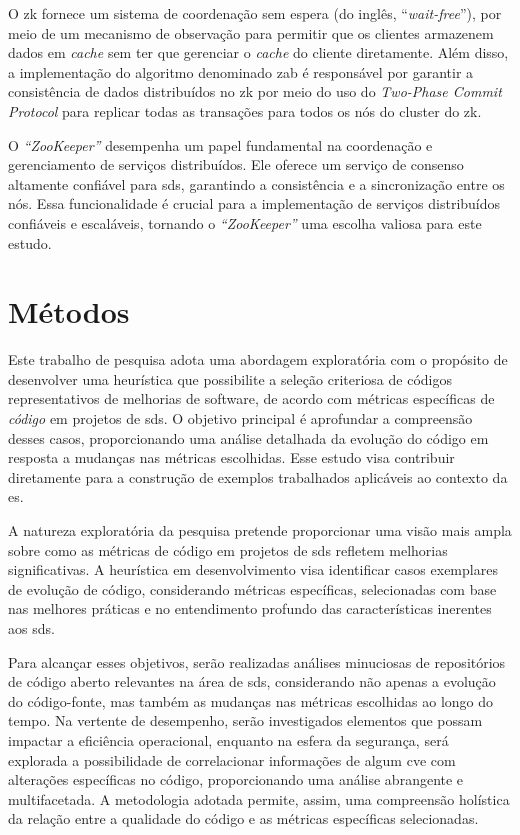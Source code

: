 O \gls{zk} fornece um sistema de coordenação sem espera (do inglês, ``\textit{wait-free}''), por meio de um mecanismo de observação para permitir que os clientes armazenem dados em \textit{cache} sem ter que gerenciar o \textit{cache} do cliente diretamente. Além disso, a implementação do algoritmo denominado \gls{zab} é responsável por garantir a consistência de dados distribuídos no \gls{zk} por meio do uso do \textit{Two-Phase Commit Protocol} para replicar todas as transações para todos os nós do cluster do \gls{zk}\cite{CloudKarafkaZAB}.

O \textit{``ZooKeeper''} desempenha um papel fundamental na coordenação e gerenciamento de serviços distribuídos. Ele oferece um serviço de consenso altamente confiável para \gls{sds}, garantindo a consistência e a sincronização entre os nós. Essa funcionalidade é crucial para a implementação de serviços distribuídos confiáveis e escaláveis, tornando o \textit{``ZooKeeper''} uma escolha valiosa para este estudo.

\section{Métodos}\label{sec:metodo}
Este trabalho de pesquisa adota uma abordagem exploratória com o propósito de desenvolver uma heurística que possibilite a seleção criteriosa de códigos representativos de melhorias de software, de acordo com métricas específicas de \textit{código} em projetos de \gls{sds}. O objetivo principal é aprofundar a compreensão desses casos, proporcionando uma análise detalhada da evolução do código em resposta a mudanças nas métricas escolhidas. Esse estudo visa contribuir diretamente para a construção de exemplos trabalhados aplicáveis ao contexto da \gls{es}.

A natureza exploratória da pesquisa pretende proporcionar uma visão mais ampla sobre como as métricas de código em projetos de \gls{sds} refletem melhorias significativas. A heurística em desenvolvimento visa identificar casos exemplares de evolução de código, considerando métricas específicas, selecionadas com base nas melhores práticas e no entendimento profundo das características inerentes aos \gls{sds}.

Para alcançar esses objetivos, serão realizadas análises minuciosas de repositórios de código aberto relevantes na área de \gls{sds}, considerando não apenas a evolução do código-fonte, mas também as mudanças nas métricas escolhidas ao longo do tempo. Na vertente de desempenho, serão investigados elementos que possam impactar a eficiência operacional, enquanto na esfera da segurança, será explorada a possibilidade de correlacionar informações de algum \gls{cve} \cite{cve-details} com alterações específicas no código, proporcionando uma análise abrangente e multifacetada.
A metodologia adotada permite, assim, uma compreensão holística da relação entre a qualidade do código e as métricas específicas selecionadas.

